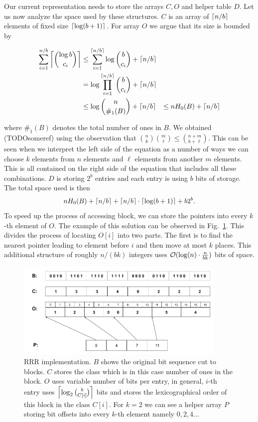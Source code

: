 Our current representation needs to store the arrays $C, O$ and helper table $D$. Let us now
analyze the space used by these structures. $C$ is an array of $\left\lceil n/b \right\rceil$ elements of fixed size
$\left\lceil \log(b+1) \right\rceil$. For array $O$ we argue that its size is bounded by

\begin{align*}
    \sum_{i=1}^{n/b} \left\lceil {\log b\choose c_i} \right\rceil
    &\leq \sum_{i=1}^{\left\lceil n/b \right\rceil} \log {b\choose c_i} + \left\lceil n/b \right\rceil \\
    &= \log\prod_{i=1}^{\left\lceil n/b \right\rceil} {b\choose c_i} + \left\lceil n/b \right\rceil \\
    &\leq \log{n\choose \#_1(B)} + \left\lceil n/b \right\rceil &\leq nH_0(B) + \left\lceil n/b \right\rceil
\end{align*}

where $\#_1(B)$ denotes the total number of ones in $B$. We obtained (TODOsomeref) using the
observation that ${n\choose k} {m\choose \ell} \leq {n+m\choose k+\ell}$. This can be seen
when we interpret the left side of the equation as a number of ways we can choose $k$ elements
from $n$ elements and $\ell$ elements from another $m$ elements. This is all contained on the
right side of the equation that includes all these combinations. $D$ is storing $2^b$ entries
and each entry is using $b$ bits of storage. The total space used is then
$$nH_0(B) + \left\lceil n/b \right\rceil + \left\lceil n/b \right\rceil \cdot \left\lceil \log(b+1) \right\rceil + b2^b.$$ To speed up the process
of accessing block, we can store the pointers into every $k$-th element of $O$. The example of
this solution can be observed in Fig.~\ref{obr:RRRFinal}. This divides the process of locating
$O[i]$ into two parts. The first is to find the nearest pointer leading to element before $i$
and then move at most $k$ places. This additional structure of roughly $n/(bk)$ integers uses
$\mathcal{O}(\log(n)\cdot \frac{n}{bk})$ bits of space.

\begin{figure}
	\centerline{
		\includegraphics[width=0.9\textwidth, height=0.3\textheight]{images/rrr}
	}
	\caption[TODO]{RRR implementation. $B$ shows the original bit sequence cut to
    blocks. $C$ stores the class which is in this case number of ones in the block.
    $O$ uses variable number of bits per entry, in general, $i$-th entry uses
    $\left\lceil \log_2{b\choose C[i]} \right\rceil$ bits and stores the lexicographical order
    of this block in the class $C[i]$. For $k=2$ we can see a helper array $P$
    storing bit offsets into every $k$-th element namely $0, 2, 4\ldots$
	}
	\label{obr:RRRFinal}
\end{figure}

